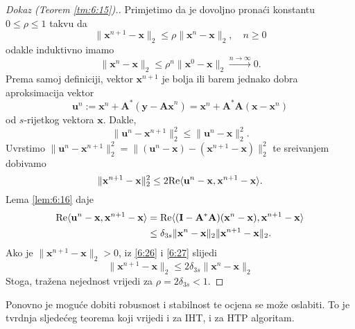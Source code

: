 \documentclass[a4paper,twoside,12pt]{memoir} %
\newcommand{\vect}[1]{\mathbf{#1}}
\renewcommand{\vec}{\vect}
\newcommand{\norm}[1]{\|{#1}\|}
\renewcommand{\Re}{\text{\normalfont{Re}}}
\begin{document}
\begin{proof}[Dokaz (Teorem \ref{tm:6:15}).]
    Primjetimo da je dovoljno prona\'ci konstantu $0 \leq \rho \leq 1$ takvu da 
    \begin{equation}\label{6:25}
        \norm{\vec x^{n+1} - \vec x}_2 \leq \rho \norm{\vec x^n - \vec x}_2, \quad n \geq 0
    \end{equation}
    odakle induktivno imamo
    \begin{equation*}
        \norm{\vec x^{n} - \vec x}_2 \leq \rho^n \norm{\vec x^0 - \vec x}_2 \xrightarrow{n \rightarrow \infty} 0. 
    \end{equation*}
    Prema samoj definiciji, vektor $\vec x^{n+1}$ je bolja ili barem jednako dobra aproksimacija vektor
    \begin{equation*}
        \vec u^n := \vec x^n + \vec A^*(\vec y - \vec{Ax}^n) = \vec x^n + \vec A^* \vec A (\vec x - \vec x^n) 
    \end{equation*}
    od $s$-rijetkog vektora $\vec x$. Dakle, 
    \begin{equation*}
        \norm{\vec u^n - \vec x^{n+1}}_2^2 \leq \norm{\vec u^n - \vec x}_2^2. 
    \end{equation*}
    Uvrstimo $\norm{\vec u ^n - \vec x^{n+1}}_2^2 = \norm{(\vec u ^n - \vec x) - (\vec x^{n+1} - \vec x)}_2^2$ te sre\dj ivanjem dobivamo
    \begin{equation}\label{6:26}
        \norm{\vec x^{n+1} - \vec x}_2^2 \leq 2 \Re \langle \vec u^n - \vec x, \vec x^{n+1} - \vec x \rangle .
    \end{equation}
    Lema \ref{lem:6:16} daje
    \begin{align}
        \Re \langle \vec u^n - \vec x, \vec x^{n+1} - \vec x \rangle &= \Re \langle (\vec I - \vec A^*\vec A)(\vec x^n - \vec x), \vec x^{n+1} - \vec x \rangle \nonumber \\
                                                                     &\leq \delta_{3s} \norm{\vec x^n - \vec x}_2 \norm{\vec x^{n+1} - \vec x}_2. \label{6:27}
    \end{align}
    Ako je $\norm{\vec x^{n+1} - \vec x}_2 > 0$, iz \eqref{6:26} i \eqref{6:27} slijedi
    \begin{equation*}
        \norm{\vec x^{n+1} - \vec x}_2 \leq 2 \delta_{3s} \norm{\vec x^n - \vec x}_2 
    \end{equation*}
    Stoga, tra\v{z}ena nejednost vrijedi za $ \rho  = 2 \delta_{3s} < 1$.
\end{proof}
Ponovno je mogu\'ce dobiti robusnost i stabilnost te ocjena se mo\v{z}e oslabiti. To je tvrdnja sljede\'ceg teorema koji vrijedi i za IHT, i za HTP algoritam.
\end{document}
